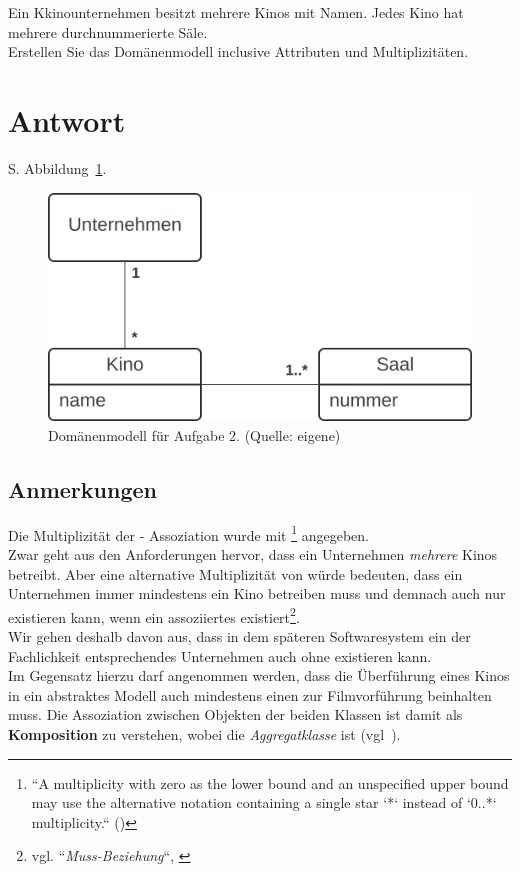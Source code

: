 Ein Kkinounternehmen besitzt mehrere Kinos mit Namen.
Jedes Kino hat mehrere durchnummerierte Säle.\\
Erstellen Sie das Domänenmodell inclusive Attributen und Multiplizitäten.


\section*{Antwort}

S. Abbildung~\ref{fig:kino}.\\

\begin{figure}
    \centering
    \includegraphics[scale=0.5]{chapters/aufgabe 2/img/kino}
    \caption{Domänenmodell für Aufgabe 2. (Quelle: eigene)}
    \label{fig:kino}
\end{figure}

\subsection*{Anmerkungen}
Die Multiplizität der  -  Assoziation wurde mit \code{*}\footnote{
    ``A multiplicity with zero as the lower bound and an unspecified upper bound may use the alternative notation containing a single star `*` instead of `0..*`
    multiplicity.`` (\cite[35]{UML17})
} angegeben.\\
Zwar geht aus den Anforderungen hervor, dass ein Unternehmen \textit{mehrere} Kinos betreibt.
Aber eine alternative Multiplizität von  würde bedeuten, dass ein Unternehmen immer mindestens ein Kino betreiben muss und demnach auch nur existieren kann, wenn ein assoziiertes  existiert\footnote{
    vgl. ``\textit{Muss-Beziehung}``, \cite[166 ff.]{Bal05}
}.\\
Wir gehen deshalb davon aus, dass in dem späteren Softwaresystem ein der Fachlichkeit entsprechendes Unternehmen auch ohne  existieren kann.\\
Im Gegensatz hierzu darf angenommen werden, dass die Überführung eines Kinos in ein abstraktes Modell auch mindestens einen  zur Filmvorführung beinhalten muss.
Die Assoziation zwischen Objekten der beiden Klassen ist damit als \textbf{Komposition} zu verstehen, wobei  die \textit{Aggregatklasse} ist (vgl~\cite[49 f.]{Bal05}).

